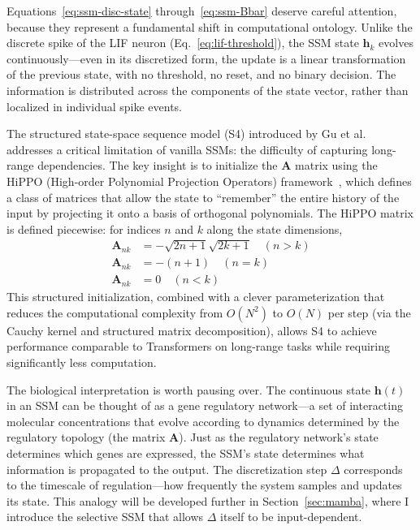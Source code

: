 \documentclass[12pt,a4paper]{article}
\renewcommand{\vec}[1]{\mathbf{#1}}
\begin{document}
Equations~\eqref{eq:ssm-disc-state} through~\eqref{eq:ssm-Bbar} deserve careful attention, because they represent a fundamental shift in computational ontology. Unlike the discrete spike of the LIF neuron (Eq.~\eqref{eq:lif-threshold}), the SSM state $\vec{h}_k$ evolves continuously---even in its discretized form, the update is a linear transformation of the previous state, with no threshold, no reset, and no binary decision. The information is distributed across the components of the state vector, rather than localized in individual spike events.

The structured state-space sequence model (S4) introduced by Gu et al.~\cite{gu2021efficiently} addresses a critical limitation of vanilla SSMs: the difficulty of capturing long-range dependencies. The key insight is to initialize the $\mathbf{A}$ matrix using the HiPPO (High-order Polynomial Projection Operators) framework~\cite{gu2020hippo}, which defines a class of matrices that allow the state to ``remember'' the entire history of the input by projecting it onto a basis of orthogonal polynomials. The HiPPO matrix is defined piecewise: for indices $n$ and $k$ along the state dimensions,
\begin{align}
\mathbf{A}_{nk} &= -\sqrt{2n+1}\sqrt{2k+1} \quad (n > k) \label{eq:hippo-gt} \\
\mathbf{A}_{nk} &= -(n+1) \quad (n = k) \label{eq:hippo-eq} \\
\mathbf{A}_{nk} &= 0 \quad (n < k) \label{eq:hippo-lt}
\end{align}
This structured initialization, combined with a clever parameterization that reduces the computational complexity from $O(N^2)$ to $O(N)$ per step (via the Cauchy kernel and structured matrix decomposition), allows S4 to achieve performance comparable to Transformers on long-range tasks while requiring significantly less computation.

The biological interpretation is worth pausing over. The continuous state $\vec{h}(t)$ in an SSM can be thought of as a gene regulatory network---a set of interacting molecular concentrations that evolve according to dynamics determined by the regulatory topology (the matrix $\mathbf{A}$). Just as the regulatory network's state determines which genes are expressed, the SSM's state determines what information is propagated to the output. The discretization step $\Delta$ corresponds to the timescale of regulation---how frequently the system samples and updates its state. This analogy will be developed further in Section~\ref{sec:mamba}, where I introduce the selective SSM that allows $\Delta$ itself to be input-dependent.
\end{document}
